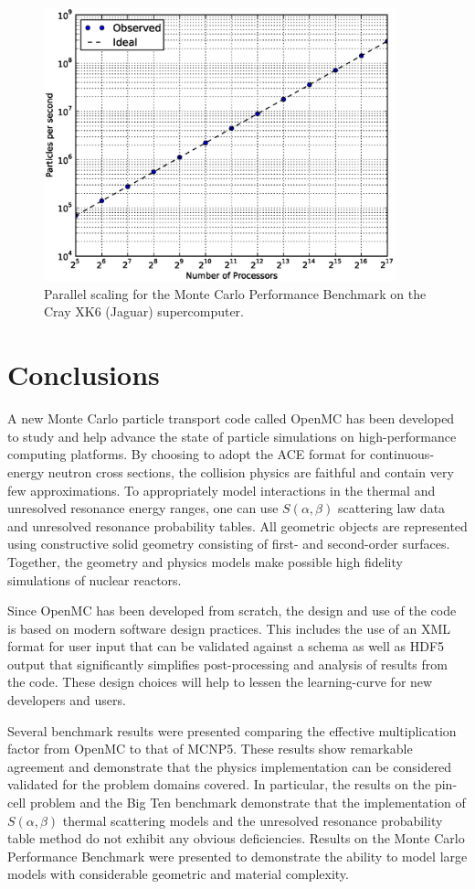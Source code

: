 \documentclass[authoryear,preprint]{elsarticle}
\begin{document}
\begin{figure}[!ht]
  \centering
  \includegraphics[width=4in]{scaling_loglog.eps}
  \caption{Parallel scaling for the Monte Carlo Performance Benchmark on the
    Cray XK6 (Jaguar) supercomputer.}
  \label{fig:scaling}
\end{figure}

\section{Conclusions}

A new Monte Carlo particle transport code called OpenMC has been developed to
study and help advance the state of particle simulations on high-performance
computing platforms. By choosing to adopt the ACE format for continuous-energy
neutron cross sections, the collision physics are faithful and contain very few
approximations. To appropriately model interactions in the thermal and
unresolved resonance energy ranges, one can use $S(\alpha,\beta)$ scattering law
data and unresolved resonance probability tables. All geometric objects are
represented using constructive solid geometry consisting of first- and
second-order surfaces. Together, the geometry and physics models make possible
high fidelity simulations of nuclear reactors.

Since OpenMC has been developed from scratch, the design and use of the code is
based on modern software design practices. This includes the use of an XML
format for user input that can be validated against a schema as well as HDF5
output that significantly simplifies post-processing and analysis of results
from the code. These design choices will help to lessen the learning-curve for
new developers and users.

Several benchmark results were presented comparing the effective multiplication
factor from OpenMC to that of MCNP5. These results show remarkable agreement and
demonstrate that the physics implementation can be considered validated for the
problem domains covered. In particular, the results on the pin-cell problem
\citep{pincell} and the Big Ten benchmark \citep{icsbep} demonstrate that the
implementation of $S(\alpha,\beta)$ thermal scattering models and the unresolved
resonance probability table method do not exhibit any obvious
deficiencies. Results on the Monte Carlo Performance Benchmark
\citep{hoogenboom} were presented to demonstrate the ability to model large
models with considerable geometric and material complexity.
\end{document}
